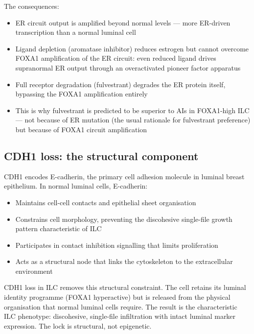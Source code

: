\documentclass[12pt, a4paper]{article}
\begin{document}
The consequences:

\begin{itemize}
    \item ER circuit output is amplified beyond
    normal levels --- more ER-driven transcription
    than a normal luminal cell
    \item Ligand depletion (aromatase inhibitor)
    reduces estrogen but cannot overcome FOXA1
    amplification of the ER circuit: even reduced
    ligand drives supranormal ER output through
    an overactivated pioneer factor apparatus
    \item Full receptor degradation (fulvestrant)
    degrades the ER protein itself, bypassing the
    FOXA1 amplification entirely
    \item This is why fulvestrant is predicted
    to be superior to AIs in FOXA1-high ILC ---
    not because of ER mutation (the usual rationale
    for fulvestrant preference) but because of
    FOXA1 circuit amplification
\end{itemize}

\subsection{CDH1 loss: the structural component}

CDH1 encodes E-cadherin, the primary cell adhesion
molecule in luminal breast epithelium. In normal
luminal cells, E-cadherin:

\begin{itemize}
    \item Maintains cell-cell contacts and
    epithelial sheet organisation
    \item Constrains cell morphology, preventing
    the discohesive single-file growth pattern
    characteristic of ILC
    \item Participates in contact inhibition
    signalling that limits proliferation
    \item Acts as a structural node that links
    the cytoskeleton to the extracellular
    environment
\end{itemize}

CDH1 loss in ILC removes this structural
constraint. The cell retains its luminal identity
programme (FOXA1 hyperactive) but is released from
the physical organisation that normal luminal cells
require. The result is the characteristic ILC
phenotype: discohesive, single-file infiltration
with intact luminal marker expression. The lock is
structural, not epigenetic.
\end{document}
